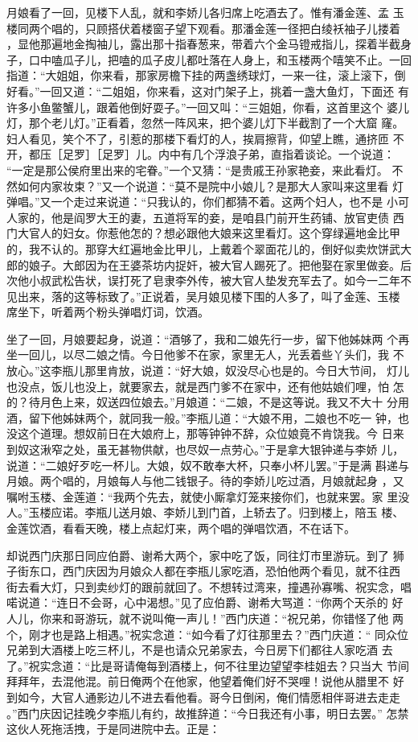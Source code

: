 月娘看了一回，见楼下人乱，就和李娇儿各归席上吃酒去了。惟有潘金莲、孟
玉楼同两个唱的，只顾搭伏着楼窗子望下观看。那潘金莲一径把白绫袄袖子儿搂着
，显他那遍地金掏袖儿，露出那十指春葱来，带着六个金马镫戒指儿，探着半截身
子，口中嗑瓜子儿，把嗑的瓜子皮儿都吐落在人身上，和玉楼两个嘻笑不止。一回
指道：“大姐姐，你来看，那家房檐下挂的两盏绣球灯，一来一往，滚上滚下，倒
好看。”一回又道：“二姐姐，你来看，这对门架子上，挑着一盏大鱼灯，下面还
有许多小鱼鳖蟹儿，跟着他倒好耍子。”一回又叫：“三姐姐，你看，这首里这个
婆儿灯，那个老儿灯。”正看着，忽然一阵风来，把个婆儿灯下半截割了一个大窟
窿。妇人看见，笑个不了，引惹的那楼下看灯的人，挨肩擦背，仰望上瞧，通挤匝
不开，都压［足罗］［足罗］儿。内中有几个浮浪子弟，直指着谈论。一个说道：
“一定是那公侯府里出来的宅眷。”一个又猜：“是贵戚王孙家艳妾，来此看灯。
不然如何内家妆束？”又一个说道：“莫不是院中小娘儿？是那大人家叫来这里看
灯弹唱。”又一个走过来说道：“只我认的，你们都猜不着。这两个妇人，也不是
小可人家的，他是阎罗大王的妻，五道将军的妾，是咱县门前开生药铺、放官吏债
西门大官人的妇女。你惹他怎的？想必跟他大娘来这里看灯。这个穿绿遍地金比甲
的，我不认的。那穿大红遍地金比甲儿，上戴着个翠面花儿的，倒好似卖炊饼武大
郎的娘子。大郎因为在王婆茶坊内捉奸，被大官人踢死了。把他娶在家里做妾。后
次他小叔武松告状，误打死了皂隶李外传，被大官人垫发充军去了。如今一二年不
见出来，落的这等标致了。”正说着，吴月娘见楼下围的人多了，叫了金莲、玉楼
席坐下，听着两个粉头弹唱灯词，饮酒。

坐了一回，月娘要起身，说道：“酒够了，我和二娘先行一步，留下他姊妹两
个再坐一回儿，以尽二娘之情。今日他爹不在家，家里无人，光丢着些丫头们，我
不放心。”这李瓶儿那里肯放，说道：“好大娘，奴没尽心也是的。今日大节间，
灯儿也没点，饭儿也没上，就要家去，就是西门爹不在家中，还有他姑娘们哩，怕
怎的？待月色上来，奴送四位娘去。”月娘道：“二娘，不是这等说。我又不大十
分用酒，留下他姊妹两个，就同我一般。”李瓶儿道：“大娘不用，二娘也不吃一
钟，也没这个道理。想奴前日在大娘府上，那等钟钟不辞，众位娘竟不肯饶我。今
日来到奴这湫窄之处，虽无甚物供献，也尽奴一点劳心。”于是拿大银钟递与李娇
儿，说道：“二娘好歹吃一杯儿。大娘，奴不敢奉大杯，只奉小杯儿罢。”于是满
斟递与月娘。两个唱的，月娘每人与他二钱银子。待的李娇儿吃过酒，月娘就起身
，又嘱咐玉楼、金莲道：“我两个先去，就使小厮拿灯笼来接你们，也就来罢。家
里没人。”玉楼应诺。李瓶儿送月娘、李娇儿到门首，上轿去了。归到楼上，陪玉
楼、金莲饮酒，看看天晚，楼上点起灯来，两个唱的弹唱饮酒，不在话下。

却说西门庆那日同应伯爵、谢希大两个，家中吃了饭，同往灯市里游玩。到了
狮子街东口，西门庆因为月娘众人都在李瓶儿家吃酒，恐怕他两个看见，就不往西
街去看大灯，只到卖纱灯的跟前就回了。不想转过湾来，撞遇孙寡嘴、祝实念，唱
喏说道：“连日不会哥，心中渴想。”见了应伯爵、谢希大骂道：“你两个天杀的
好人儿，你来和哥游玩，就不说叫俺一声儿！”西门庆道：“祝兄弟，你错怪了他
两个，刚才也是路上相遇。”祝实念道：“如今看了灯往那里去？”西门庆道：“
同众位兄弟到大酒楼上吃三杯儿，不是也请众兄弟家去，今日房下们都往人家吃酒
去了。”祝实念道：“比是哥请俺每到酒楼上，何不往里边望望李桂姐去？只当大
节间拜拜年，去混他混。前日俺两个在他家，他望着俺们好不哭哩！说他从腊里不
好到如今，大官人通影边儿不进去看他看。哥今日倒闲，俺们情愿相伴哥进去走走
。”西门庆因记挂晚夕李瓶儿有约，故推辞道：“今日我还有小事，明日去罢。”
怎禁这伙人死拖活拽，于是同进院中去。正是：

